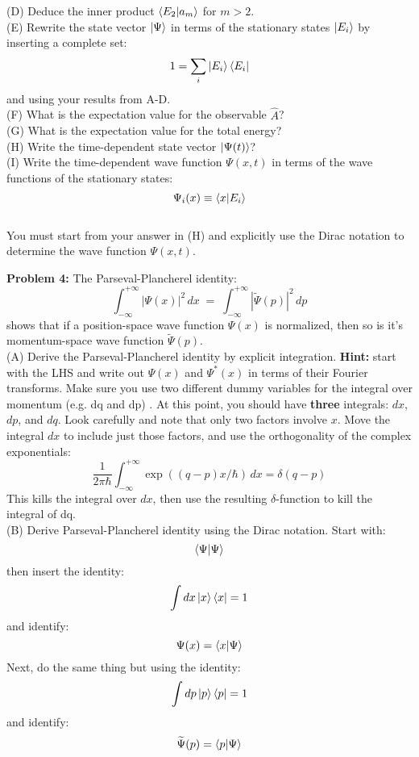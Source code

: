 \documentclass[12pt]{article}
\begin{document}
\noindent
(D) Deduce the inner product $\braket{E_2|a_m}$ for $m>2$.\\[5pt]

\noindent
(E) Rewrite the state vector $\ket{\Psi}$ in terms of the stationary states $\ket{E_i}$ by inserting a complete set:
$$1 = \sum_i \ket{E_i}\bra{E_i}$$
and using your results from A-D.\\[5pt]

\noindent
(F) What is the expectation value for the observable $\hat{A}$?\\[5pt]

\noindent
(G) What is the expectation value for the total energy?\\[5pt]

\noindent
(H) Write the time-dependent state vector $\ket{\Psi(t)}$?\\[5pt]

\noindent
(I) Write the time-dependent wave function $\Psi(x,t)$ in terms of the wave functions of the stationary states:
$$\Psi_{i}(x) \equiv \braket{x|E_i}$$\\[5pt]
You must start from your answer in (H) and explicitly use the Dirac notation to determine the wave function $\Psi(x,t)$.

\newpage

\noindent
{\bf Problem 4:} The Parseval-Plancherel identity:
$$\int_{-\infty}^{+\infty} |\Psi(x)|^2 \, dx \; = \; \int_{-\infty}^{+\infty} |\widetilde{\Psi}(p)|^2 \, dp$$
shows that if a position-space wave function $\Psi(x)$ is normalized, then so is it's momentum-space wave function $\widetilde{\Psi}(p)$.\\[5pt]

\noindent
(A) Derive the Parseval-Plancherel identity by explicit integration.  {\bf Hint:  } start with the LHS and write out $\Psi(x)$ and $\Psi^*(x)$ in terms of their Fourier transforms.  Make sure you use two different dummy variables for the integral over momentum (e.g. dq and dp) .  At this point, you should have {\bf three} integrals: $dx$,$dp$, and $dq$.  Look carefully and note that only two factors involve $x$.  Move the integral $dx$ to include just those factors, and use the orthogonality of the complex exponentials:
$$\frac{1}{2\pi\hbar}\int_{-\infty}^{+\infty} \exp((q-p)x/\hbar) \, dx = \delta(q-p)$$
This kills the integral over $dx$, then use the resulting $\delta$-function to kill the integral of dq.\\[5pt]

\noindent
(B) Derive Parseval-Plancherel identity using the Dirac notation.  Start with:
$$\braket{\Psi|\Psi}$$
then insert the identity:
$$\int dx \ket{x}\bra{x} = 1$$
and identify:
$$\Psi(x) = \braket{x|\Psi}$$
Next, do the same thing but using the identity:
$$\int dp \ket{p}\bra{p} = 1$$
and identify:
$$\widetilde{\Psi}(p) = \braket{p|\Psi}$$
\end{document}
